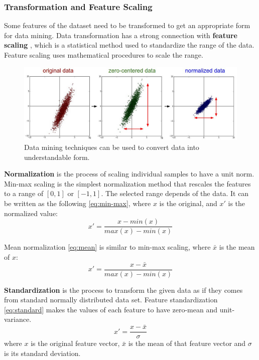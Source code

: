 \subsubsection{Transformation and Feature Scaling}

Some features of the dataset need to be transformed to get an appropriate form for data mining. Data transformation has a strong connection with \textbf{feature scaling} \cite{zheng2018feature}\cite{dong2018feature}, which is a statistical method used to standardize the range of the data. Feature scaling uses mathematical procedures to scale the range. 

\begin{figure}[h]
	\centering
	\includegraphics[height=0.35\linewidth]{./figures/data_mining}
	\caption{Data mining techniques can be used to convert data into understandable form.}
	\label{fig:data_mining}
\end{figure}

\textbf{Normalization} is the process of scaling individual samples to have a unit norm. Min-max scaling is the simplest normalization method that rescales the features to a range of $[0, 1]$ or $[-1, 1]$. The selected range depends of the data. It can be written as the following \eqref{eq:min-max}, where $x$ is the original, and $x'$ is the normalized value:
\begin{equation} x' = \frac{x-min(x)}{max(x)-min(x)} \label{eq:min-max} \end{equation} 

\smallskip \noindent Mean normalization \eqref{eq:mean} is similar to min-max scaling, where $\bar x$ is the mean of $x$:
\begin{equation} x' = \frac{x-\bar x}{max(x)-min(x)} \label{eq:mean} \end{equation} \medskip

\textbf{Standardization} is the process to transform the given data as if they comes from standard normally distributed data set. Feature standardization \eqref{eq:standard} makes the values of each feature to have zero-mean and unit-variance. 
\begin{equation}  x'= \frac{x-\bar x}{\sigma} \label{eq:standard} \end{equation}
where $x$ is the original feature vector, $\bar x$ is the mean of that feature vector and $\sigma$ is its standard deviation.\bigskip

